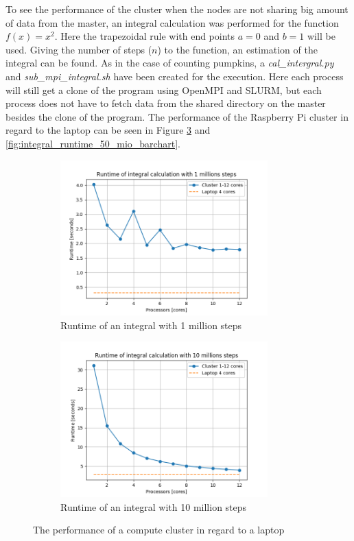 \documentclass[../Head/Report.tex]{subfiles}
\begin{document}
To see the performance of the cluster when the nodes are not sharing big amount of data from the master, an integral calculation was performed for the function $f(x) = x^2$. Here the trapezoidal rule with end points $a=0$ and $b=1$ will be used. Giving the number of steps ($n$) to the function, an estimation of the integral can be found. As in the case of counting pumpkins, a \textit{cal\_intergral.py} and \textit{sub\_mpi\_integral.sh} have been created for the execution. Here each process will still get a clone of the program using OpenMPI and SLURM, but each process does not have to fetch data from the shared directory on the master besides the clone of the program. The performance of the Raspberry Pi cluster in regard to the laptop can be seen in Figure \ref{fig:integral_runtime_1_10mio} and \ref{fig:integral_runtime_50_mio_barchart}.    

\begin{figure}[H]
\centering
  \begin{subfigure}[b]{0.48\textwidth}
  \centering
    \includegraphics[height=6cm]{../Figures/integral_runtime_test_1mio.png}
    \caption{Runtime of an integral with 1 million steps}
    \label{fig:integral_runtime_1mio}
  \end{subfigure}
  \hfill
  \begin{subfigure}[b]{0.48\textwidth}
  \centering
    \includegraphics[height=6cm]{../Figures/integral_runtime_test_10mio.png}
    \caption{Runtime of an integral with 10 million steps}
    \label{fig:integral_runtime_10mio}
  \end{subfigure}
  \caption{The performance of a compute cluster in regard to a laptop}
  \label{fig:integral_runtime_1_10mio}
\end{figure}
\end{document}
